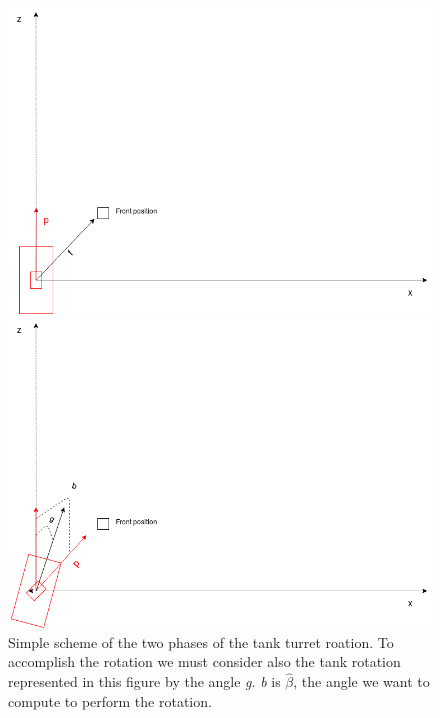 \documentclass[14pt]{article}
\begin{document}
\begin{figure}[H]
\begin{minipage}[t]{0.77\textwidth}
\center
\includegraphics[width=\textwidth]{diagrams/turretChart.png}
\end{minipage}
\hfill
\begin{minipage}[t]{0.77\textwidth}
\center
\includegraphics[width=\textwidth]{diagrams/turretChartRot.png}
\end{minipage}
\caption{Simple scheme of the two phases of the tank turret roation. To accomplish the rotation we must consider also the tank rotation represented in this figure by the angle \textit{g}. \textit{b} is \(\hat{\beta}\), the angle we want to compute to perform the rotation.}
\label{img:turretChartOrientation}
\end{figure}
\end{document}
